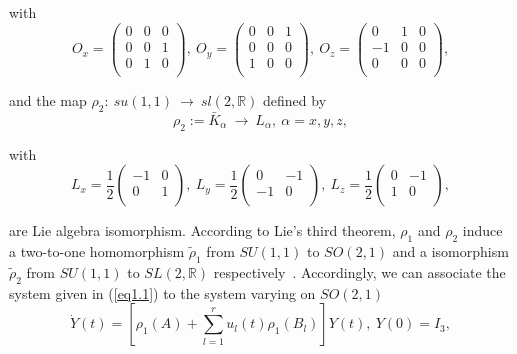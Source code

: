 \documentclass[onecolumn,showpacs,showkeys,preprintnumbers]{revtex4}
\begin{document}
\noindent with\noindent\begin{equation}\label{eq4.2}O_x=\left(\begin{array}{ccc}
  0 & 0 & 0 \\
  0 & 0 & 1 \\
  0 & 1 & 0 \\
\end{array}\right),~O_y=\left(\begin{array}{ccc}
  0 & 0 & 1 \\
  0 & 0 & 0 \\
  1 & 0 & 0 \\
\end{array}\right),~O_z=\left(\begin{array}{ccc}
  0 & 1 & 0 \\
  -1& 0 & 0 \\
  0 & 0 & 0 \\
\end{array}\right),
\end{equation}

\noindent and the map
$\rho_2:~su(1,1)~\rightarrow~sl(2,\mathbb{R})$ defined by\noindent\begin{equation}\label{eq4.3}\rho_2:=\bar{K}_\alpha~\rightarrow~L_\alpha,~\alpha=x,y,z,
\end{equation}

\noindent with\noindent\begin{equation}\label{eq4.4}L_x=\frac{1}{2}\left(\begin{array}{cc}
  -1 & 0 \\
  0 & 1 \\
\end{array}\right),~L_y=\frac{1}{2}\left(\begin{array}{cc}
  0 & -1 \\
  -1 & 0\\
\end{array}\right),~L_z=\frac{1}{2}\left(\begin{array}{cc}
  0 & -1 \\
  1 & 0 \\
\end{array}\right),\end{equation}

\noindent are Lie algebra isomorphism. According to Lie's third
theorem, $\rho_1$ and $\rho_2$ induce a two-to-one homomorphism
$\tilde{\rho}_1$ from $SU(1,1)$ to $SO(2,1)$ and a isomorphism
$\tilde{\rho}_2$ from $SU(1,1)$ to $SL(2,\mathbb{R})$
respectively~\cite{Vilenkin1}. Accordingly, we can associate the
system given in (\ref{eq1.1}) to
the system varying on $SO(2,1)$\noindent\begin{equation}\label{eq4.5}
\dot{Y}(t)=[\rho_1(A)+\sum_{l=1}^{r}u_l(t)\rho_1(B_l)]Y(t),~Y(0)=I_3,
\end{equation}
\end{document}
